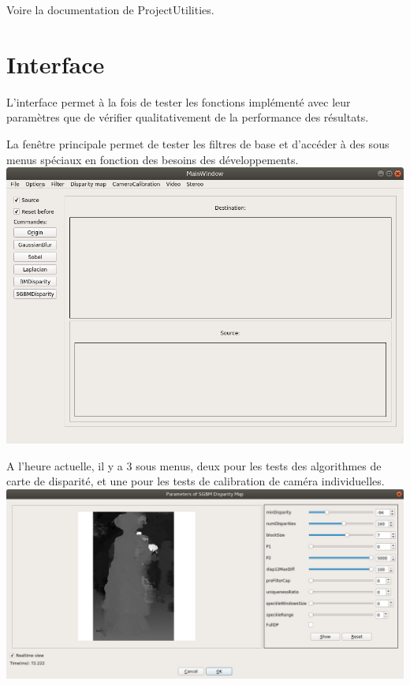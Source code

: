 \documentclass{article}
\begin{document}
Voire la documentation de ProjectUtilities.\\

\newpage
\section{Interface}


L'interface permet à la fois de tester les fonctions implémenté avec leur paramètres que de vérifier qualitativement de la performance des résultats.

La fenêtre principale permet de tester les filtres de base et d'accéder à des sous menus spéciaux en fonction des besoins des développements.\\

\includegraphics[width=\linewidth]{img/interface.png}

A l'heure actuelle, il y a 3 sous menus, deux pour les tests des algorithmes de carte de disparité, et une pour les tests de calibration de caméra individuelles.\\

\includegraphics[width=\linewidth]{img/bm.png}\\
\end{document}
